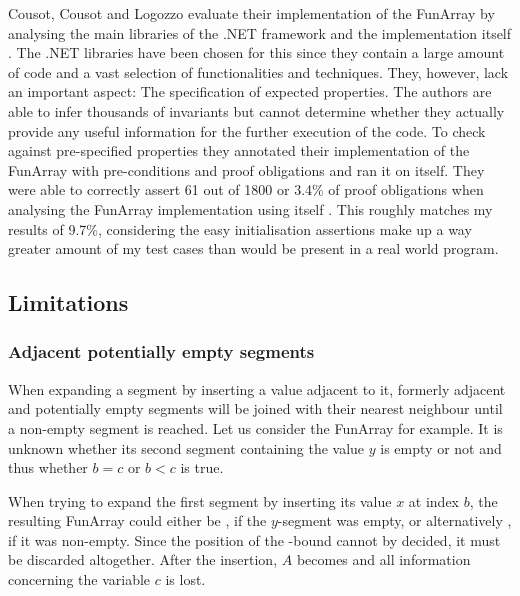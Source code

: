 Cousot, Cousot and Logozzo evaluate their implementation of the FunArray by analysing the main libraries of the .NET framework and the implementation itself \cite{cousot2011}. The .NET libraries have been chosen for this since they contain a large amount of code and a vast selection of functionalities and techniques. They, however, lack an important aspect: The specification of expected properties. The authors are able to infer thousands of invariants but cannot determine whether they actually provide any useful information for the further execution of the code. To check against pre-specified properties they annotated their implementation of the FunArray with pre-conditions and proof obligations and ran it on itself. They were able to correctly assert 61 out of 1800 or 3.4\% of proof obligations when analysing the FunArray implementation using itself \cite{cousot2011}. This roughly matches my results of 9.7\%, considering the easy initialisation assertions make up a way greater amount of my test cases than would be present in a real world program.

\subsection{Limitations}

\subsubsection{Adjacent potentially empty segments}
When expanding a segment by inserting a value adjacent to it, formerly adjacent and potentially empty segments will be joined with their nearest neighbour until a non-empty segment is reached. Let us consider the FunArray  for example. It is unknown whether its second segment containing the value $y$ is empty or not and thus whether $b=c$ or $b<c$ is true.

When trying to expand the first segment by inserting its value $x$ at index $b$, the resulting FunArray could either be , if the $y$-segment was empty, or alternatively , if it was non-empty. Since the position of the -bound cannot by decided, it must be discarded altogether. After the insertion, $A$ becomes  and all information concerning the variable $c$ is lost.

